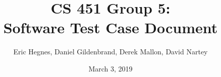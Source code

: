 \documentclass[titlepage]{article}
\title{CS 451 Group 5:\\
Software Test Case Document}
\author{Eric Hegnes, Daniel Gildenbrand, Derek Mallon, David Nartey}
\date{March 3, 2019}
\begin{document}
\maketitle
\tableofcontents
\pagebreak


\pagebreak


\pagebreak


\pagebreak


\pagebreak
\end{document}
